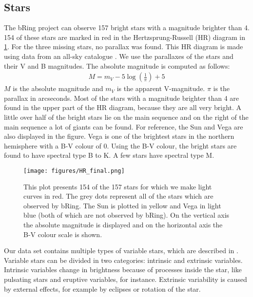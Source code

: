 \documentclass[onecolumn]{aa} %
\begin{document}
\subsection{Stars}
The bRing project can observe 157 bright stars with a magnitude brighter than 4.
%
154 of these stars are marked in red in the Hertzsprung-Russell (HR) diagram in \ref{HRD}. For the three missing stars, no parallax was found.
%
This HR diagram is made using data from an all-sky catalogue \citep{Kharchenko_2001}.
%
We use the parallaxes of the stars and their V and B magnitudes. The absolute magnitude is computed as follows:
\begin{align}
    M = m_V -5\log\left(\frac{1}{\pi}\right) + 5
\end{align}
$M$ is the absolute magnitude and $m_V$ is the apparent V-magnitude. $\pi$ is the parallax in arcseconds.
%
Most of the stars with a magnitude brighter than 4 are found in the upper part of the HR diagram, because they are all very bright.
%
A little over half of the bright stars lie on the main sequence and on the right of the main sequence a lot of giants can be found.
%
For reference, the Sun and Vega are also displayed in the figure.
%
Vega is one of the brightest stars in the northern hemisphere with a B-V colour of 0.
%
Using the B-V colour, the bright stars are found to have spectral type B to K.
%
A few stars have spectral type M. 
\begin{figure}
    \centering
    \texttt{[image: figures/HR\_final.png]}
    \caption{This plot presents 154 of the 157 stars for which we make light curves in red.
      The grey dots represent all of the stars which are observed by bRing.
      The Sun is plotted in yellow and Vega in light blue (both of which are not observed by bRing).
      On the vertical axis the absolute magnitude is displayed and on the horizontal axis the B-V colour scale is shown.}
    \label{HRD}
  \end{figure}


  

  Our data set contains multiple types of variable stars, which are described in \cite{Samus_2004}.
  Variable stars can be divided in two categories: intrinsic and extrinsic variables.
  Intrinsic variables change in brightness because of processes inside the star, like pulsating stars and eruptive variables, for instance.
  Extrinsic variability is caused by external effects, for example by eclipses or rotation of the star.
\end{document}

